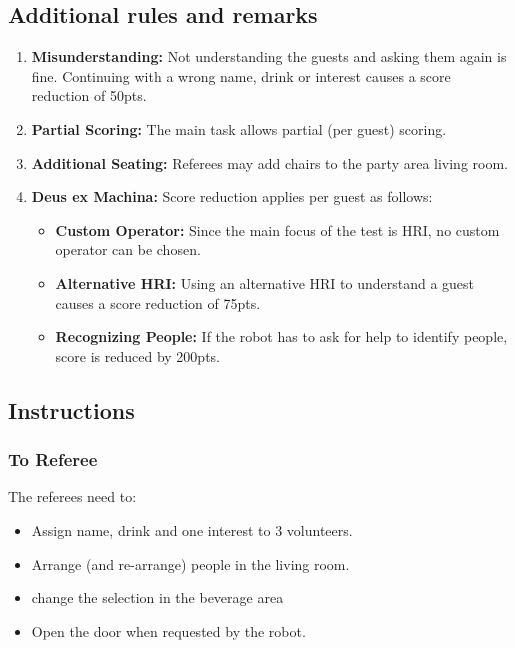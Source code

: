 \subsection*{Additional rules and remarks}
\begin{enumerate}[nosep]
	\item \textbf{Misunderstanding:} Not understanding the guests and asking them again is fine. Continuing with a wrong name, drink  or interest causes a score reduction of 50pts.
		
	\item \textbf{Partial Scoring:} The main task allows partial (per guest) scoring.

	\item \textbf{Additional Seating:} Referees may add chairs to the party area living room.
	
	\item \textbf{Deus ex Machina:} Score reduction applies per guest as follows:
	\begin{itemize}[nosep]
		\item \textbf{Custom Operator:} Since the main focus of the test is HRI, no custom operator can be chosen.
		\item \textbf{Alternative HRI:} Using an alternative HRI to understand a guest causes a score reduction of 75pts.
		\item \textbf{Recognizing People:} If the robot has to ask for help to identify people, score is reduced by 200pts. 
	\end{itemize}
\end{enumerate}


\subsection*{Instructions}

\subsubsection*{To Referee}

The referees need to:
\begin{itemize}
	\item Assign name, drink and one interest to 3 volunteers.
	\item Arrange (and re-arrange) people in the living room.
	\item change the selection in the beverage area
	\item Open the door when requested by the robot.
\end{itemize}

